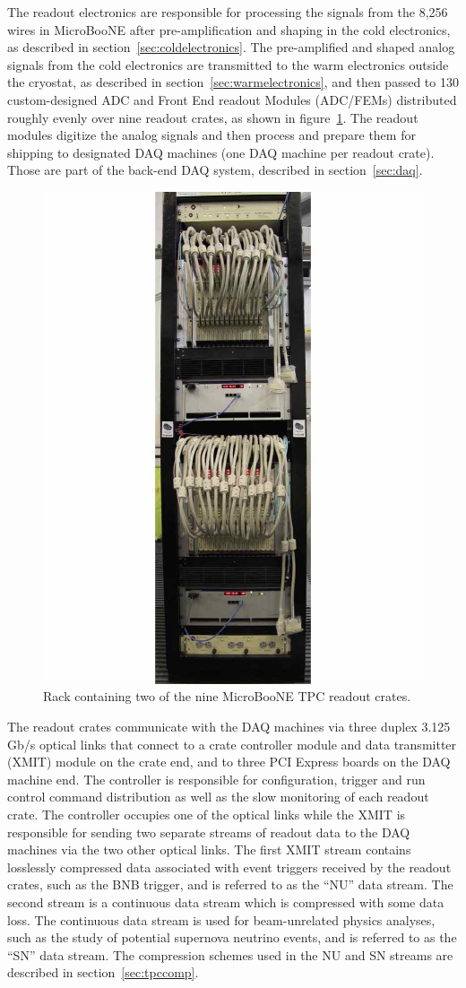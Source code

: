 The \lartpc readout electronics are responsible for processing the signals from the 8,256 wires in MicroBooNE after pre-amplification and shaping in the cold electronics, as described in section~\ref{sec:coldelectronics}.  The pre-amplified and shaped analog signals from the cold electronics are transmitted to the warm electronics outside the cryostat, as described in section~\ref{sec:warmelectronics}, and then passed to 130 custom-designed ADC and Front End readout Modules (ADC/FEMs) distributed roughly evenly over nine readout crates, as shown in figure~\ref{fig:rocrates}.  The readout modules digitize the analog signals and then process and prepare them for shipping to designated DAQ machines (one DAQ machine per readout crate). Those are part of the back-end DAQ system, described in section~\ref{sec:daq}. 

\begin{figure}
\begin{center}
\includegraphics[width=0.3\linewidth]{figures/rocrates.jpg}
\end{center}
\caption{\label{fig:rocrates}Rack containing two of the nine MicroBooNE TPC readout crates.}
\end{figure}

The \lartpc readout crates communicate with the DAQ machines via three duplex 3.125 Gb/s optical links that connect to a crate controller module and data transmitter (XMIT) module on the crate end, and to three PCI Express boards on the DAQ machine end. The controller is responsible for configuration, trigger and run control command distribution as well as the slow monitoring of each readout crate. The controller occupies one of the optical links while the XMIT is responsible for sending two separate streams of readout data to the DAQ machines via the two other optical links. The first XMIT stream contains losslessly compressed \lartpc data associated with event triggers received by the \lartpc readout crates, such as the BNB trigger, and is referred to as the ``NU'' data stream. The second stream is a continuous \lartpc data stream which is compressed with some data loss. The continuous data stream is used for beam-unrelated physics analyses, such as the study of potential supernova neutrino events, and is referred to as the ``SN'' data stream. The compression schemes used in the NU and SN streams are described in section~\ref{sec:tpccomp}.

